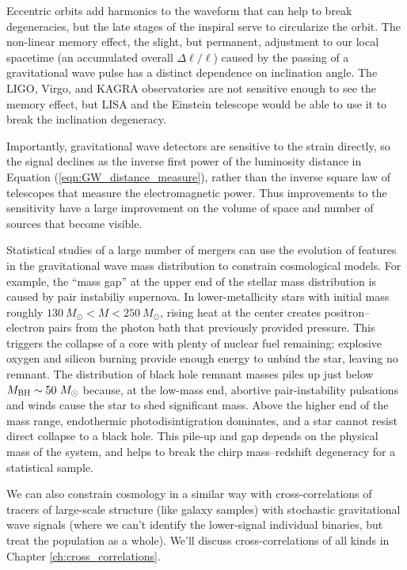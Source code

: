 Eccentric orbits add harmonics to the waveform that can help to break degeneracies, but the late stages of the inspiral serve to circularize the orbit.  The non-linear memory effect, the slight, but permanent, adjustment to our local spacetime (an accumulated overall $\Delta \ell/\ell$) caused by the passing of a gravitational wave pulse has a distinct dependence on inclination angle.  The LIGO, Virgo, and KAGRA observatories are not sensitive enough to see the memory effect, but LISA and the Einstein telescope would be able to use it to break the inclination degeneracy.

Importantly, gravitational wave detectors are sensitive to the strain directly, so the signal declines as the inverse first power of the luminosity distance in Equation (\ref{eqn:GW_distance_measure}), rather than the inverse square law of telescopes that measure the electromagnetic power.  Thus improvements to the sensitivity have a large improvement on the volume of space and number of sources that become visible.

Statistical studies of a large number of mergers can use the evolution of features in the gravitational wave mass distribution to constrain cosmological models.  For example, the ``mass gap'' at the upper end of the stellar mass distribution is caused by pair instabiliy supernova.  In lower-metallicity stars with initial mass roughly $130 \ M_\odot < M < 250 \ M_\odot$, rising heat at the center creates positron--electron pairs from the photon bath that previously provided pressure.  This triggers the collapse of a core with plenty of nuclear fuel remaining; explosive oxygen and silicon burning provide enough energy to unbind the star, leaving no remnant.  The distribution of black hole  remnant masses piles up just below $M_{\rm BH} \sim 50\ M_\odot$ because, at the low-mass end, abortive pair-instability pulsations and winds cause the star to shed significant mass.  Above the higher end of the mass range, endothermic photodisintigration dominates, and a star cannot resist direct collapse to a black hole.  This pile-up and gap depends on the physical mass of the system, and helps to break the chirp mass--redshift degeneracy for a statistical sample.

We can also constrain cosmology in a similar way with cross-correlations of tracers of large-scale structure (like galaxy samples) with  stochastic gravitational wave signals (where we can't identify the lower-signal individual binaries, but treat the population as a whole).  We'll discuss cross-correlations of all kinds in Chapter \ref{ch:cross_correlations}. 


